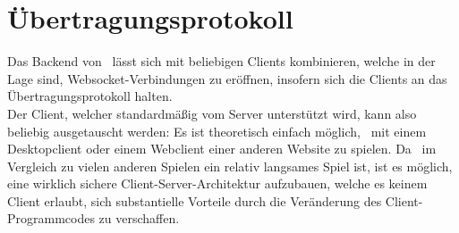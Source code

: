 \section{Übertragungsprotokoll}
Das Backend von \vires\ lässt sich mit beliebigen Clients kombinieren, welche in der Lage sind, Websocket-Verbindungen zu eröffnen,
insofern sich die Clients an das Übertragungsprotokoll halten. \\
Der Client, welcher standardmäßig vom Server unterstützt wird, kann also beliebig ausgetauscht werden:
Es ist theoretisch einfach möglich, \vires\ mit einem Desktopclient oder einem Webclient einer anderen Website zu spielen.
Da \vires\ im Vergleich zu vielen anderen Spielen ein relativ langsames Spiel ist, ist es möglich, 
eine wirklich sichere Client-Server-Architektur aufzubauen, welche es keinem Client erlaubt, sich
substantielle Vorteile durch die Veränderung des Client-Programmcodes zu verschaffen. \\
